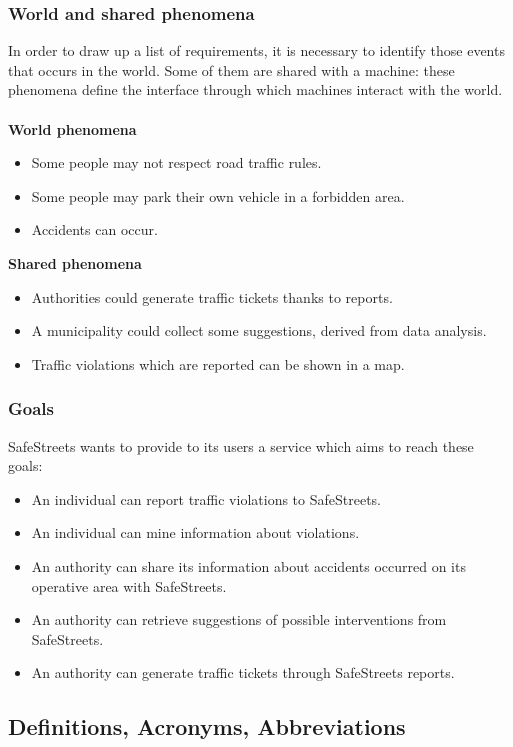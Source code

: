 \documentclass{article}
\newcommand\goal[1]{\item[{[G#1]}] }
\begin{document}
			\subsubsection{World and shared phenomena}
				In order to draw up a list of requirements, it is necessary to identify those events that occurs in the world. Some of them are shared with a machine: these phenomena define the interface through which machines interact with the world.\\\\				
				\textbf{World phenomena}
				\begin{itemize}
					\item Some people may not respect road traffic rules.
					\item Some people may park their own vehicle in a forbidden area.
					\item Accidents can occur.
				\end{itemize}
				\textbf{Shared phenomena}
				\begin{itemize}
					\item Authorities could generate traffic tickets thanks to reports. 
					\item A municipality could collect some suggestions, derived from data analysis.
					\item Traffic violations which are reported can be shown in a map.
				\end{itemize}
			\subsubsection{Goals}
				SafeStreets wants to provide to its users a service which aims to reach these goals:
				\begin{itemize}
					\goal{1}An individual can report traffic violations to SafeStreets.
					\goal{2}An individual can mine information about violations.					
					\goal{3}An authority can share its information about accidents occurred on its operative area with SafeStreets.
					\goal{4}An authority can retrieve suggestions of possible interventions from SafeStreets.
					\goal{5}An authority can generate traffic tickets through SafeStreets reports.
				\end{itemize}
				
				
		\subsection{Definitions, Acronyms, Abbreviations}
\end{document}
